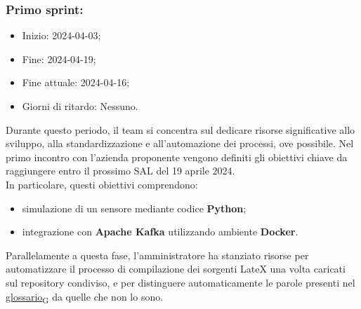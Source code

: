 \subsubsection{Primo sprint:}
\begin{itemize}
    \item Inizio: 2024-04-03;
    \item Fine: 2024-04-19;
    \item Fine attuale: 2024-04-16;
    \item Giorni di ritardo: Nessuno.
\end{itemize}
Durante questo periodo, il team si concentra sul dedicare risorse significative allo sviluppo, alla standardizzazione e all'automazione dei processi, ove possibile. Nel primo incontro con l'azienda proponente vengono definiti gli obiettivi chiave da raggiungere entro il prossimo SAL del 19 aprile 2024. \\In particolare, questi obiettivi comprendono:
\begin{itemize}
    \item simulazione di un sensore mediante codice \textbf{Python};
    \item integrazione con \textbf{Apache Kafka} utilizzando ambiente \textbf{Docker}.
\end{itemize}
Parallelamente a questa fase, l'amministratore ha stanziato risorse per automatizzare il processo di compilazione dei sorgenti LateX una volta caricati sul repository condiviso, e per distinguere automaticamente le parole presenti nel \href{https://7last.github.io/docs/rtb/documentazione-interna/glossario#glossario}{glossario\textsubscript{G}} da quelle che non lo sono.

